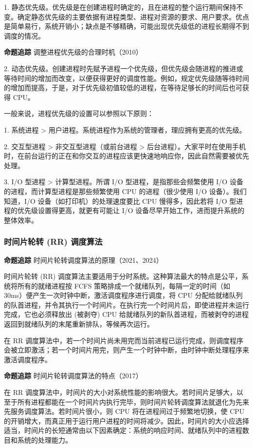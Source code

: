 \documentclass{ctexbook}
\begin{document}
	1. 静态优先级。优先级是在创建进程时确定的，且在进程的整个运行期间保持不变。确定静态优先级的主要依据有进程类型、进程对资源的要求、用户要求。优点是简单易行，系统开销小；缺点是不够精确，可能出现优先级低的进程长期得不到调度的情况。
	
	\textbf{命题追踪} 调整进程优先级的合理时机（2010）
	
	2. 动态优先级。创建进程时先赋予进程一个优先级，但优先级会随进程的推进或等待时间的增加而改变，以便获得更好的调度性能。例如，规定优先级随等待时间的增加而提高，于是，对于优先级初值较低的进程，在等待足够长的时间后也可获得 CPU。
	
	一般来说，进程优先级的设置可以参照以下原则：
	
	1. 系统进程 > 用户进程。系统进程作为系统的管理者，理应拥有更高的优先级。
	
	2. 交互型进程 > 非交互型进程（或前台进程 > 后台进程）。大家平时在使用手机时，在前台运行的正在和你交互的进程应该更快速地响应你，因此自然需要被优先处理。
	
	3. I/O 型进程 > 计算型进程。所谓 I/O 型进程，是指那些会频繁使用 I/O 设备的进程，而计算型进程是那些频繁使用 CPU 的进程（很少使用 I/O 设备）。我们知道，I/O 设备（如打印机）的处理速度要比 CPU 慢得多，因此若将 I/O 型进程的优先级设置得更高，就更有可能让 I/O 设备尽早开始工作，进而提升系统的整体效率。
	
	\subsubsection{时间片轮转 (RR) 调度算法}
	
	\textbf{命题追踪} 时间片轮转调度算法的原理（2021、2024）
	
	时间片轮转 (RR) 调度算法主要适用于分时系统。这种算法最大的特点是公平，系统将所有的就绪进程按 FCFS 策略排成一个就绪队列，每隔一定的时间（如 30ms）便产生一次时钟中断，激活调度程序进行调度，将 CPU 分配给就绪队列的队首进程，并令其执行一个时间片。在执行完一个时间片后，即使进程并未运行完成，它也必须释放出 (被剥夺) CPU 给就绪队列的新队首进程，而被剥夺的进程返回到就绪队列的末尾重新排队，等候再次运行。
	
	在 RR 调度算法中，若一个时间片尚未用完而当前进程已运行完成，则调度程序会被立即激活；若一个时间片用完，则产生一个时钟中断，由时钟中断处理程序来激活调度程序。
	
	\textbf{命题追踪} 时间片轮转调度算法的特点（2017）
	
	在 RR 调度算法中，时间片的大小对系统性能的影响很大。若时间片足够大，以至于所有进程都能在一个时间片内执行完毕，则时间片轮转调度算法就退化为先来先服务调度算法。若时间片很小，则 CPU 将在进程间过于频繁地切换，使 CPU 的开销增大，而真正用于运行用户进程的时间将减少。因此，时间片的大小应选择适当，时间片的长短通常由以下因素确定：系统的响应时间、就绪队列中的进程数目和系统的处理能力。
	
\end{document}
